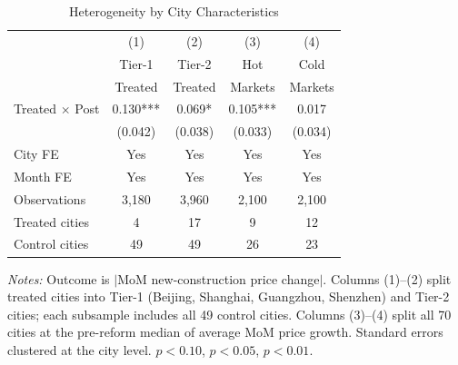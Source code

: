\begin{table}[H]
\centering
\caption{Heterogeneity by City Characteristics}
\label{tab:heterogeneity}
\begin{threeparttable}
\begin{tabular}{lcccc}
\toprule
 & (1) & (2) & (3) & (4) \\
 & Tier-1 & Tier-2 & Hot & Cold \\
 & Treated & Treated & Markets & Markets \\
\midrule
Treated $\times$ Post & 0.130*** & 0.069* & 0.105*** & 0.017 \\
 & (0.042) & (0.038) & (0.033) & (0.034) \\
\midrule
City FE & Yes & Yes & Yes & Yes \\
Month FE & Yes & Yes & Yes & Yes \\
Observations & 3,180 & 3,960 & 2,100 & 2,100 \\
Treated cities & 4 & 17 & 9 & 12 \\
Control cities & 49 & 49 & 26 & 23 \\
\bottomrule
\end{tabular}
\begin{tablenotes}[flushleft]
\small
\item \textit{Notes:} Outcome is $|$MoM new-construction price change$|$. Columns (1)--(2) split treated cities into Tier-1 (Beijing, Shanghai, Guangzhou, Shenzhen) and Tier-2 cities; each subsample includes all 49 control cities. Columns (3)--(4) split all 70 cities at the pre-reform median of average MoM price growth. Standard errors clustered at the city level. \sym{*} $p<0.10$, \sym{**} $p<0.05$, \sym{***} $p<0.01$.
\end{tablenotes}
\end{threeparttable}
\end{table}

